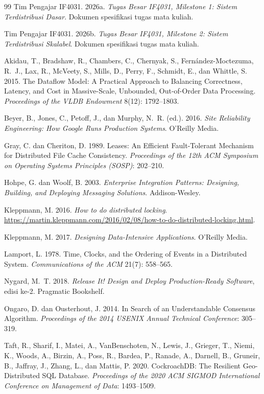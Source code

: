 \documentclass{fairmeta}
\begin{document}
\begin{thebibliography}{99}
Tim Pengajar IF4031. 2026a.
\textit{Tugas Besar IF4031, Milestone 1: Sistem Terdistribusi Dasar}.
Dokumen spesifikasi tugas mata kuliah.

Tim Pengajar IF4031. 2026b.
\textit{Tugas Besar IF4031, Milestone 2: Sistem Terdistribusi Skalabel}.
Dokumen spesifikasi tugas mata kuliah.

Akidau, T., Bradshaw, R., Chambers, C., Chernyak, S., Fern\'andez-Moctezuma, R.~J., Lax, R., McVeety, S., Mills, D., Perry, F., Schmidt, E., dan Whittle, S. 2015.
The Dataflow Model: A Practical Approach to Balancing Correctness, Latency, and Cost in Massive-Scale, Unbounded, Out-of-Order Data Processing.
\textit{Proceedings of the VLDB Endowment} 8(12): 1792--1803.

Beyer, B., Jones, C., Petoff, J., dan Murphy, N.~R. (ed.). 2016.
\textit{Site Reliability Engineering: How Google Runs Production Systems}.
O'Reilly Media.

Gray, C. dan Cheriton, D. 1989.
Leases: An Efficient Fault-Tolerant Mechanism for Distributed File Cache Consistency.
\textit{Proceedings of the 12th ACM Symposium on Operating Systems Principles (SOSP)}: 202--210.

Hohpe, G. dan Woolf, B. 2003.
\textit{Enterprise Integration Patterns: Designing, Building, and Deploying Messaging Solutions}.
Addison-Wesley.

Kleppmann, M. 2016.
\textit{How to do distributed locking}.
\url{https://martin.kleppmann.com/2016/02/08/how-to-do-distributed-locking.html}.

Kleppmann, M. 2017.
\textit{Designing Data-Intensive Applications}.
O'Reilly Media.

Lamport, L. 1978.
Time, Clocks, and the Ordering of Events in a Distributed System.
\textit{Communications of the ACM} 21(7): 558--565.

Nygard, M.~T. 2018.
\textit{Release It! Design and Deploy Production-Ready Software}, edisi ke-2.
Pragmatic Bookshelf.

Ongaro, D. dan Ousterhout, J. 2014.
In Search of an Understandable Consensus Algorithm.
\textit{Proceedings of the 2014 USENIX Annual Technical Conference}: 305--319.

Taft, R., Sharif, I., Matei, A., VanBenschoten, N., Lewis, J., Grieger, T., Niemi, K., Woods, A., Birzin, A., Poss, R., Bardea, P., Ranade, A., Darnell, B., Gruneir, B., Jaffray, J., Zhang, L., dan Mattis, P. 2020.
CockroachDB: The Resilient Geo-Distributed SQL Database.
\textit{Proceedings of the 2020 ACM SIGMOD International Conference on Management of Data}: 1493--1509.
\end{thebibliography}
\end{document}
